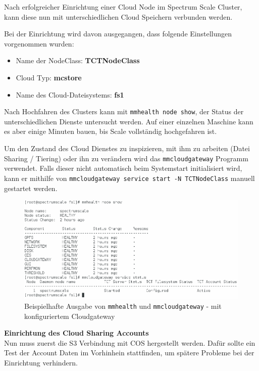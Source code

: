Nach erfolgreicher Einrichtung einer Cloud Node im Spectrum Scale Cluster, kann diese nun mit unterschiedlichen Cloud Speichern verbunden werden.

Bei der Einrichtung wird davon ausgegangen, dass folgende Einstellungen vorgenommen wurden:
\begin{itemize}
	\item Name der NodeClass: \textbf{TCTNodeClass}
	\item Cloud Typ: \textbf{mcstore}
	\item Name des Cloud-Dateisystems: \textbf{fs1}
\end{itemize}

Nach Hochfahren des Clusters kann mit \lstinline|mmhealth node show|, der Status der unterschiedlichen Dienste untersucht werden. Auf einer einzelnen Maschine kann es aber einige Minuten bauen, bis Scale vollständig hochgefahren ist.

Um den Zustand des Cloud Dienstes zu inspizieren, mit ihm zu arbeiten (Datei Sharing / Tiering) oder ihn zu verändern wird das \lstinline|mmcloudgateway| Programm verwendet. Falls dieser nicht automatisch beim Systemstart initialisiert wird, kann er mithilfe von \lstinline|mmcloudgateway service start -N TCTNodeClass| manuell gestartet werden.

\begin{figure}[hbt]
	\centering
	\includegraphics[scale=0.5]{images/scale-status}
	\caption{Beispielhafte Ausgabe von \lstinline|mmhealth| und \lstinline|mmcloudgateway| - mit konfiguriertem Cloudgateway}
	\label{fig:saclestatus}
\end{figure}


\textbf{Einrichtung des Cloud Sharing Accounts}\\
Nun muss zuerst die S3 Verbindung mit \ac{COS} hergestellt werden. Dafür sollte ein Test der Account Daten im Vorhinhein stattfinden, um spätere Probleme bei der Einrichtung verhindern.

